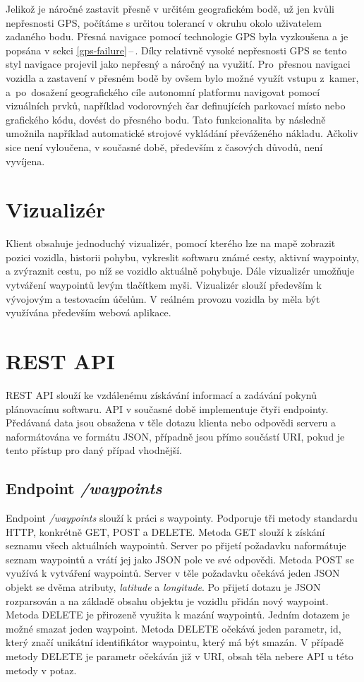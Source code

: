 \documentclass[czech, bachelor]{diploma}
\newcommand{\peteref}[1]{\ref{#1}\,--\,\nameref{#1}}
\begin{document}
Jelikož je náročné zastavit přesně v určitém geografickém bodě, už jen kvůli nepřesnosti GPS, počítáme s určitou tolerancí
v okruhu okolo uživatelem zadaného bodu. Přesná navigace pomocí technologie GPS byla vyzkoušena a je popsána v sekci
\peteref{gps-failure}. Díky relativně vysoké nepřesnosti GPS se tento styl navigace projevil jako nepřesný a náročný na využití.
Pro~přesnou navigaci vozidla a zastavení v přesném bodě by ovšem bylo možné využít vstupu z~kamer, a~po~dosažení geografického
cíle autonomní platformu navigovat pomocí vizuálních prvků, například vodorovných čar definujících parkovací místo nebo
grafického kódu, dovést do přesného bodu. Tato funkcionalita by následně umožnila například automatické strojové vykládání
převáženého nákladu. Ačkoliv sice není vyloučena, v současné době, především z časových důvodů, není vyvíjena.

\section{Vizualizér} \label{visualizer}

Klient obsahuje jednoduchý vizualizér, pomocí kterého lze na mapě zobrazit pozici vozidla, historii pohybu, vykreslit
softwaru známé cesty, aktivní waypointy, a zvýraznit cestu, po níž se vozidlo aktuálně pohybuje. Dále vizualizér umožňuje
vytváření waypointů levým tlačítkem myši. Vizualizér slouží především k vývojovým a testovacím účelům. V reálném provozu vozidla
by měla být využívána především webová aplikace.

\section{REST API} \label{rest-api}

REST API slouží ke vzdálenému získávání informací a zadávání pokynů plánovacímu softwaru. API v současné době implementuje čtyři
endpointy. Předávaná data jsou obsažena v těle dotazu klienta nebo odpovědi serveru a naformátována ve formátu JSON, případně jsou
přímo součástí URI, pokud je tento přístup pro daný případ vhodnější.

\subsection{Endpoint \emph{/waypoints}}

Endpoint \emph{/waypoints} slouží k práci s waypointy. Podporuje tři metody standardu HTTP, konkrétně GET, POST a DELETE.  Metoda
GET slouží k získání seznamu všech aktuálních waypointů. Server po přijetí požadavku naformátuje seznam waypointů a vrátí jej jako
JSON pole ve své odpovědi. Metoda POST se využívá k vytváření waypointů. Server v těle požadavku očekává jeden JSON objekt se
dvěma atributy, \emph{latitude} a \emph{longitude}. Po přijetí dotazu je JSON rozparsován a na základě obsahu objektu je vozidlu
přidán nový waypoint. Metoda DELETE je přirozeně využita k mazání waypointů. Jedním dotazem je možné smazat jeden waypoint. Metoda
DELETE očekává jeden parametr, id, který značí unikátní identifikátor waypointu, který má být smazán. V případě metody DELETE
je parametr očekáván již v URI, obsah těla nebere API u této metody v potaz.
\end{document}
